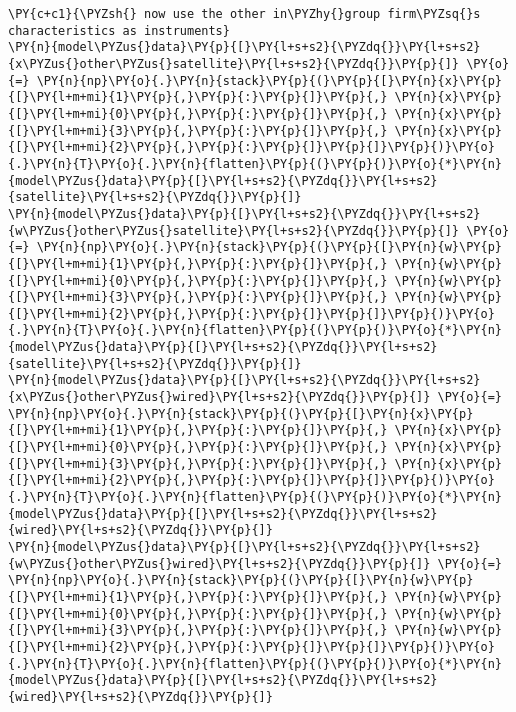 \begin{tcolorbox}[breakable, size=fbox, boxrule=1pt, pad at break*=1mm,colback=cellbackground, colframe=cellborder]
\begin{Verbatim}[commandchars=\\\{\}]
\PY{c+c1}{\PYZsh{} now use the other in\PYZhy{}group firm\PYZsq{}s characteristics as instruments}
\PY{n}{model\PYZus{}data}\PY{p}{[}\PY{l+s+s2}{\PYZdq{}}\PY{l+s+s2}{x\PYZus{}other\PYZus{}satellite}\PY{l+s+s2}{\PYZdq{}}\PY{p}{]} \PY{o}{=} \PY{n}{np}\PY{o}{.}\PY{n}{stack}\PY{p}{(}\PY{p}{[}\PY{n}{x}\PY{p}{[}\PY{l+m+mi}{1}\PY{p}{,}\PY{p}{:}\PY{p}{]}\PY{p}{,} \PY{n}{x}\PY{p}{[}\PY{l+m+mi}{0}\PY{p}{,}\PY{p}{:}\PY{p}{]}\PY{p}{,} \PY{n}{x}\PY{p}{[}\PY{l+m+mi}{3}\PY{p}{,}\PY{p}{:}\PY{p}{]}\PY{p}{,} \PY{n}{x}\PY{p}{[}\PY{l+m+mi}{2}\PY{p}{,}\PY{p}{:}\PY{p}{]}\PY{p}{]}\PY{p}{)}\PY{o}{.}\PY{n}{T}\PY{o}{.}\PY{n}{flatten}\PY{p}{(}\PY{p}{)}\PY{o}{*}\PY{n}{model\PYZus{}data}\PY{p}{[}\PY{l+s+s2}{\PYZdq{}}\PY{l+s+s2}{satellite}\PY{l+s+s2}{\PYZdq{}}\PY{p}{]}
\PY{n}{model\PYZus{}data}\PY{p}{[}\PY{l+s+s2}{\PYZdq{}}\PY{l+s+s2}{w\PYZus{}other\PYZus{}satellite}\PY{l+s+s2}{\PYZdq{}}\PY{p}{]} \PY{o}{=} \PY{n}{np}\PY{o}{.}\PY{n}{stack}\PY{p}{(}\PY{p}{[}\PY{n}{w}\PY{p}{[}\PY{l+m+mi}{1}\PY{p}{,}\PY{p}{:}\PY{p}{]}\PY{p}{,} \PY{n}{w}\PY{p}{[}\PY{l+m+mi}{0}\PY{p}{,}\PY{p}{:}\PY{p}{]}\PY{p}{,} \PY{n}{w}\PY{p}{[}\PY{l+m+mi}{3}\PY{p}{,}\PY{p}{:}\PY{p}{]}\PY{p}{,} \PY{n}{w}\PY{p}{[}\PY{l+m+mi}{2}\PY{p}{,}\PY{p}{:}\PY{p}{]}\PY{p}{]}\PY{p}{)}\PY{o}{.}\PY{n}{T}\PY{o}{.}\PY{n}{flatten}\PY{p}{(}\PY{p}{)}\PY{o}{*}\PY{n}{model\PYZus{}data}\PY{p}{[}\PY{l+s+s2}{\PYZdq{}}\PY{l+s+s2}{satellite}\PY{l+s+s2}{\PYZdq{}}\PY{p}{]}
\PY{n}{model\PYZus{}data}\PY{p}{[}\PY{l+s+s2}{\PYZdq{}}\PY{l+s+s2}{x\PYZus{}other\PYZus{}wired}\PY{l+s+s2}{\PYZdq{}}\PY{p}{]} \PY{o}{=} \PY{n}{np}\PY{o}{.}\PY{n}{stack}\PY{p}{(}\PY{p}{[}\PY{n}{x}\PY{p}{[}\PY{l+m+mi}{1}\PY{p}{,}\PY{p}{:}\PY{p}{]}\PY{p}{,} \PY{n}{x}\PY{p}{[}\PY{l+m+mi}{0}\PY{p}{,}\PY{p}{:}\PY{p}{]}\PY{p}{,} \PY{n}{x}\PY{p}{[}\PY{l+m+mi}{3}\PY{p}{,}\PY{p}{:}\PY{p}{]}\PY{p}{,} \PY{n}{x}\PY{p}{[}\PY{l+m+mi}{2}\PY{p}{,}\PY{p}{:}\PY{p}{]}\PY{p}{]}\PY{p}{)}\PY{o}{.}\PY{n}{T}\PY{o}{.}\PY{n}{flatten}\PY{p}{(}\PY{p}{)}\PY{o}{*}\PY{n}{model\PYZus{}data}\PY{p}{[}\PY{l+s+s2}{\PYZdq{}}\PY{l+s+s2}{wired}\PY{l+s+s2}{\PYZdq{}}\PY{p}{]}
\PY{n}{model\PYZus{}data}\PY{p}{[}\PY{l+s+s2}{\PYZdq{}}\PY{l+s+s2}{w\PYZus{}other\PYZus{}wired}\PY{l+s+s2}{\PYZdq{}}\PY{p}{]} \PY{o}{=} \PY{n}{np}\PY{o}{.}\PY{n}{stack}\PY{p}{(}\PY{p}{[}\PY{n}{w}\PY{p}{[}\PY{l+m+mi}{1}\PY{p}{,}\PY{p}{:}\PY{p}{]}\PY{p}{,} \PY{n}{w}\PY{p}{[}\PY{l+m+mi}{0}\PY{p}{,}\PY{p}{:}\PY{p}{]}\PY{p}{,} \PY{n}{w}\PY{p}{[}\PY{l+m+mi}{3}\PY{p}{,}\PY{p}{:}\PY{p}{]}\PY{p}{,} \PY{n}{w}\PY{p}{[}\PY{l+m+mi}{2}\PY{p}{,}\PY{p}{:}\PY{p}{]}\PY{p}{]}\PY{p}{)}\PY{o}{.}\PY{n}{T}\PY{o}{.}\PY{n}{flatten}\PY{p}{(}\PY{p}{)}\PY{o}{*}\PY{n}{model\PYZus{}data}\PY{p}{[}\PY{l+s+s2}{\PYZdq{}}\PY{l+s+s2}{wired}\PY{l+s+s2}{\PYZdq{}}\PY{p}{]}


\end{Verbatim}
\end{tcolorbox}
